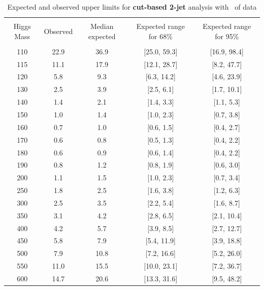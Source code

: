 \begin{table}[!hbp]
\begin{center}
\begin{tabular}{c c c c c}
\hline
\vspace{-3mm} && \\
Higgs Mass & Observed & Median expected & Expected range for 68\% & Expected range for 95\%   \\
\vspace{-3mm} && \\
\hline
110 & 22.9 & 36.9 & [25.0, 59.3] & [16.9, 98.4] \\
115 & 11.1 & 17.9 & [12.1, 28.7] & [8.2, 47.7] \\
120 & 5.8 & 9.3 & [6.3, 14.2] & [4.6, 23.9] \\
130 & 2.5 & 3.9 & [2.5, 6.1] & [1.7, 10.1] \\
140 & 1.4 & 2.1 & [1.4, 3.3] & [1.1, 5.3] \\
150 & 1.0 & 1.4 & [1.0, 2.3] & [0.7, 3.8] \\
160 & 0.7 & 1.0 & [0.6, 1.5] & [0.4, 2.7] \\
170 & 0.6 & 0.8 & [0.5, 1.3] & [0.4, 2.2] \\
180 & 0.6 & 0.9 & [0.6, 1.4] & [0.4, 2.2] \\
190 & 0.8 & 1.2 & [0.8, 1.9] & [0.6, 3.0] \\
200 & 1.1 & 1.5 & [1.0, 2.3] & [0.7, 3.4] \\
250 & 1.8 & 2.5 & [1.6, 3.8] & [1.2, 6.3] \\
300 & 2.5 & 3.5 & [2.2, 5.4] & [1.6, 8.7] \\
350 & 3.1 & 4.2 & [2.8, 6.5] & [2.1, 10.4] \\
400 & 4.2 & 5.7 & [3.9, 8.5] & [2.7, 12.7] \\
450 & 5.8 & 7.9 & [5.4, 11.9] & [3.9, 18.8] \\
500 & 7.9 & 10.8 & [7.2, 16.6] & [5.2, 26.0] \\
550 & 11.0 & 15.5 & [10.0, 23.1] & [7.2, 36.7] \\
600 & 14.7 & 20.6 & [13.3, 31.6] & [9.5, 48.2] \\
\hline
\end{tabular}
\caption{Expected and observed upper limits for {\bf cut-based 2-jet}
  analysis with \intlumi\ of data}
\label{tab:vbf_cut}
\end{center}
\end{table}

